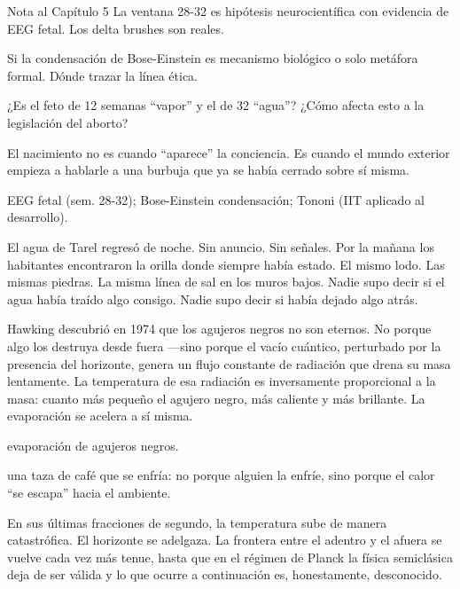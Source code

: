 \begin{notacap}{Nota al Capítulo 5}
 La ventana 28-32 es hipótesis neurocientífica con evidencia de EEG fetal. Los delta brushes son reales.

 Si la condensación de Bose-Einstein es mecanismo biológico o solo metáfora formal. Dónde trazar la línea ética.

 ¿Es el feto de 12 semanas “vapor” y el de 32 “agua”? ¿Cómo afecta esto a la legislación del aborto?

 El nacimiento no es cuando “aparece” la conciencia. Es cuando el mundo exterior empieza a hablarle a una burbuja que ya se había cerrado sobre sí misma.

 EEG fetal (sem. 28-32); Bose-Einstein condensación; Tononi (IIT aplicado al desarrollo).
\end{notacap}
\begin{cita}
El agua de Tarel regresó de noche. Sin anuncio. Sin señales. Por la mañana los habitantes encontraron la orilla donde siempre había estado. El mismo lodo. Las mismas piedras. La misma línea de sal en los muros bajos. Nadie supo decir si el agua había traído algo consigo. Nadie supo decir si había dejado algo atrás.
\end{cita}
\noindent {} Hawking descubrió en 1974 que los agujeros negros no son eternos. No porque algo los destruya desde fuera —sino porque el vacío cuántico, perturbado por la presencia del horizonte, genera un flujo constante de radiación que drena su masa lentamente. La temperatura de esa radiación es inversamente proporcional a la masa: cuanto más pequeño el agujero negro, más caliente y más brillante. La evaporación se acelera a sí misma.

\begin{fisica}
 evaporación de agujeros negros.

 una taza de café que se enfría: no porque alguien la enfríe, sino porque el calor “se escapa” hacia el ambiente.
\end{fisica}
En sus últimas fracciones de segundo, la temperatura sube de manera catastrófica. El horizonte se adelgaza. La frontera entre el adentro y el afuera se vuelve cada vez más tenue, hasta que en el régimen de Planck la física semiclásica deja de ser válida y lo que ocurre a continuación es, honestamente, desconocido.

